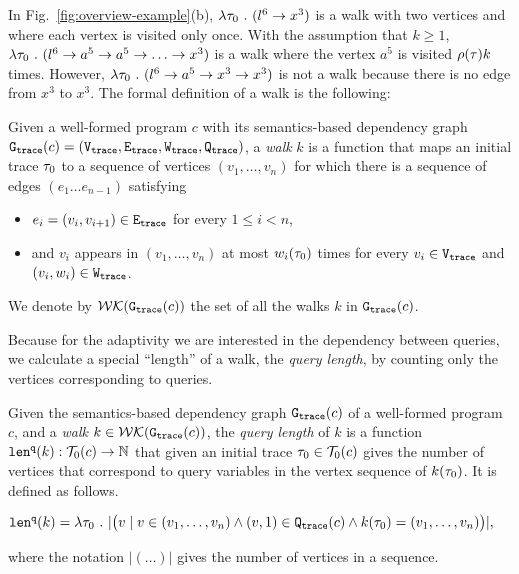 In Fig.~\ref{fig:overview-example}(b), $\lambda \mathtt{\tau}_0 ~.~ (l^6 \to x^3)$ is a walk with two vertices and where each vertex is visited only once. 
With the assumption that $k \geq 1$, $\lambda \mathtt{\tau}_0 ~.~ (l^6 \to {a^5 \to a^5 \to \ldots} \to x^3)$ is a walk where the vertex $a^5$ is visited $\rho(\mathtt{\tau}) k$ times.
However, $\lambda \mathtt{\tau}_0 ~.~ (l^6 \to a^5 \to x^3 \to x^3)$ is not a walk because there is no edge from $x^3$ to $x^3$.
The formal definition of a walk is the following:
\begin{defn}[Walk]
\label{def:finitewalk}
Given a well-formed program $c$ with its semantics-based dependency graph $\mathtt{{G_{trace}}}({c}) = (\mathtt{{V_{trace}}}, \mathtt{{E_{trace}}}, \mathtt{{W_{trace}}}, \mathtt{{Q_{trace}}})$, a \emph{walk} $k$ is a function that maps an initial trace $\mathtt{\tau}_0$ to a sequence of vertices $(v_1, \ldots, v_{n})$
for which there is a sequence of edges $(e_1 \ldots e_{n - 1})$  satisfying
\begin{itemize}
\item $e_i = (v_{i},v_{i + 1}) \in \mathtt{{E_{trace}}}$ for every $1 \leq i < n$,
\item and $v_i$ appears in $(v_1, \ldots, v_{n})$ at most $w_i(\mathtt{\tau}_0)$ times for every $v_i \in \mathtt{{V_{trace}}}$ and $(v_i, w_i) \in \mathtt{{W_{trace}}}$.  
\end{itemize}
We denote by $\mathcal{WK}(\mathtt{{G_{trace}}}(c))$
the set of all the walks $k$ in $\mathtt{{G_{trace}}}(c)$.
\end{defn} 
Because for the adaptivity
we are interested in the dependency between queries,
we calculate a special ``length'' of a walk, the \emph{query length},  by counting only the vertices
corresponding to queries.
\begin{defn}
\label{def:qlen}
Given 
the semantics-based dependency graph $\mathtt{{G_{trace}}}({c})$ of a well-formed program $c$,
 and a \emph{walk} 
 $k \in \mathcal{WK}(\mathtt{{G_{trace}}}(c))$, 
the \emph{query length} of $k$ is a function $\mathtt{len}^{\tt q}(k):\mathcal{T}_0(c) \to \mathbb{N}$ that 
given an initial trace $\mathtt{\tau}_0\in \mathcal{T}_0(c)$ 
gives
the number of vertices that correspond to query variables in the vertex sequence of $k(\mathtt{\tau}_0)$.
It is defined as follows.
\begin{center}
   $
  \mathtt{len}^{\tt q}(k) = \lambda \mathtt{\tau}_0 ~.~ |\big( v \mid v \in (v_1, \ldots, v_{n}) \land (v, 1) \in \mathtt{{Q_{trace}}}(c) 
  \land k(\mathtt{\tau}_0) = (v_1, \ldots, v_{n}) \big)|,
$
\end{center}
where the notation $| (\ldots) |$ gives the number of vertices in a sequence.
\end{defn}

